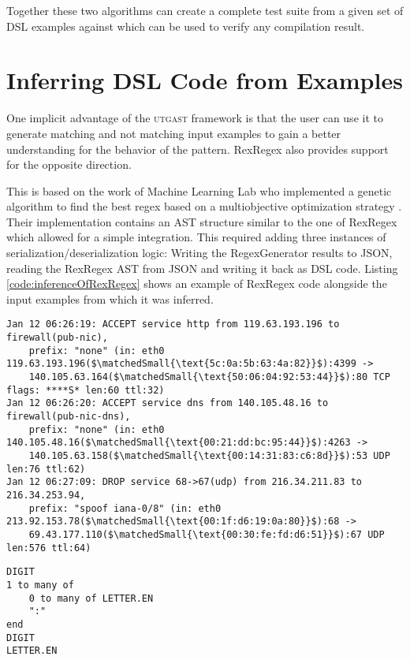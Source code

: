 Together these two algorithms can create a complete test suite from a given set of DSL examples against which can be used to verify any compilation result.

\section{Inferring DSL Code from Examples} \label{sec:inferenceOfRexRegex}

One implicit advantage of the \textsc{utgast} framework is that the user can use it to generate matching and not matching input examples to gain a better understanding for the behavior of the pattern. RexRegex also provides support for the opposite direction.

This is based on the work of Machine Learning Lab who implemented a genetic algorithm to find the best regex based on a multiobjective optimization strategy \cite{bartoli2016inference}\cite{bartoli2016can}\cite{bartoli2015evolutionary}. Their implementation contains an AST structure similar to the one of RexRegex which allowed for a simple integration. This required adding three instances of serialization/deserialization logic: Writing the RegexGenerator results to JSON, reading the RexRegex AST from JSON and writing it back as DSL code.
Listing \ref{code:inferenceOfRexRegex} shows an example of RexRegex code alongside the input examples from which it was inferred.

\FloatBarrier

\begin{inferedExample}[float=htb,title={Infered RexRegex Code from Examples},label=code:inferenceOfRexRegex]
    \begin{lstlisting}[basicstyle=\scriptsize,mathescape=true]
Jan 12 06:26:19: ACCEPT service http from 119.63.193.196 to firewall(pub-nic), 
    prefix: "none" (in: eth0 119.63.193.196($\matchedSmall{\text{5c:0a:5b:63:4a:82}}$):4399 -> 
    140.105.63.164($\matchedSmall{\text{50:06:04:92:53:44}}$):80 TCP flags: ****S* len:60 ttl:32)
Jan 12 06:26:20: ACCEPT service dns from 140.105.48.16 to firewall(pub-nic-dns), 
    prefix: "none" (in: eth0 140.105.48.16($\matchedSmall{\text{00:21:dd:bc:95:44}}$):4263 -> 
    140.105.63.158($\matchedSmall{\text{00:14:31:83:c6:8d}}$):53 UDP len:76 ttl:62)
Jan 12 06:27:09: DROP service 68->67(udp) from 216.34.211.83 to 216.34.253.94, 
    prefix: "spoof iana-0/8" (in: eth0 213.92.153.78($\matchedSmall{\text{00:1f:d6:19:0a:80}}$):68 -> 
    69.43.177.110($\matchedSmall{\text{00:30:fe:fd:d6:51}}$):67 UDP len:576 ttl:64)
    \end{lstlisting}
    \tcblower
    \begin{lstlisting}[style=rexregex]
DIGIT
1 to many of
    0 to many of LETTER.EN
    ":"
end
DIGIT
LETTER.EN
    \end{lstlisting}
\end{inferedExample}

